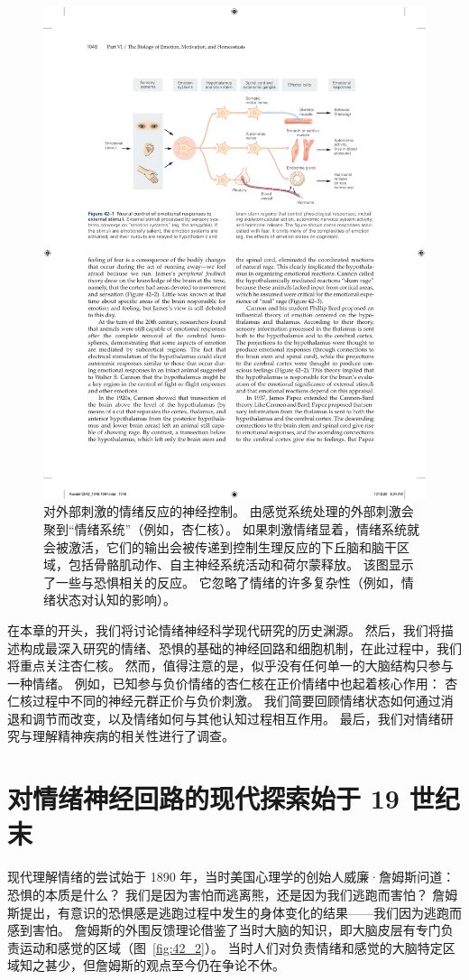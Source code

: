 \begin{figure}[htbp]
	\centering
	\includegraphics[width=0.8\linewidth]{chap42/fig_42_1}
	\caption{对外部刺激的情绪反应的神经控制。 由感觉系统处理的外部刺激会聚到“情绪系统”（例如，杏仁核）。 如果刺激情绪显着，情绪系统就会被激活，它们的输出会被传递到控制生理反应的下丘脑和脑干区域，包括骨骼肌动作、自主神经系统活动和荷尔蒙释放。 该图显示了一些与恐惧相关的反应。 它忽略了情绪的许多复杂性（例如，情绪状态对认知的影响）。}
	\label{fig:42_1}
\end{figure}


在本章的开头，我们将讨论情绪神经科学现代研究的历史渊源。
然后，我们将描述构成最深入研究的情绪、恐惧的基础的神经回路和细胞机制，在此过程中，我们将重点关注杏仁核。
然而，值得注意的是，似乎没有任何单一的大脑结构只参与一种情绪。
例如，已知参与负价情绪的杏仁核在正价情绪中也起着核心作用：
杏仁核过程中不同的神经元群正价与负价刺激。
我们简要回顾情绪状态如何通过消退和调节而改变，以及情绪如何与其他认知过程相互作用。
最后，我们对情绪研究与理解精神疾病的相关性进行了调查。



\section{对情绪神经回路的现代探索始于 19 世纪末}
现代理解情绪的尝试始于 1890 年，当时美国心理学的创始人威廉·詹姆斯问道：恐惧的本质是什么？
我们是因为害怕而逃离熊，还是因为我们逃跑而害怕？
詹姆斯提出，有意识的恐惧感是逃跑过程中发生的身体变化的结果——我们因为逃跑而感到害怕。
詹姆斯的外围反馈理论借鉴了当时大脑的知识，即大脑皮层有专门负责运动和感觉的区域（图~\ref{fig:42_2}）。
当时人们对负责情绪和感觉的大脑特定区域知之甚少，但詹姆斯的观点至今仍在争论不休。


